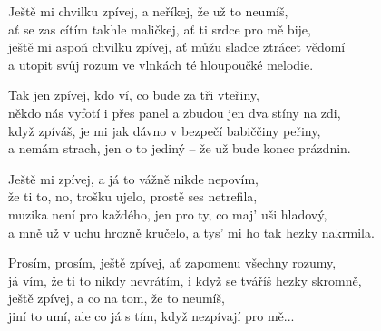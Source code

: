 
\ve{}
Ještě mi chvilku zpívej, a neříkej, že už to neumíš,\\
ať se zas cítím takhle maličkej, ať ti srdce pro mě bije,\\
ještě mi aspoň chvilku zpívej, ať můžu sladce ztrácet vědomí\\
a utopit svůj rozum ve vlnkách té hloupoučké melodie. 

\ve{}
Tak jen zpívej, kdo ví, co bude za tři vteřiny,\\
někdo nás vyfotí i přes panel a zbudou jen dva stíny na zdi,\\
když zpíváš, je mi jak dávno v bezpečí babiččiny peřiny,\\
a nemám strach, jen o to jediný -- že už bude konec prázdnin.

\ve{}
Ještě mi zpívej, a já to vážně nikde nepovím,\\
že ti to, no, trošku ujelo, prostě ses netrefila,\\
muzika není pro každého, jen pro ty, co maj' uši hladový,\\
a mně už v uchu hrozně kručelo, a tys' mi ho tak hezky nakrmila.

\ve{}
Prosím, prosím, ještě zpívej, ať zapomenu všechny rozumy,\\
já vím, že ti to nikdy nevrátím, i když se tváříš hezky skromně,\\
ještě zpívej, a co na tom, že to neumíš,\\
jiní to umí, ale co já s tím, když nezpívají pro mě...

\esong